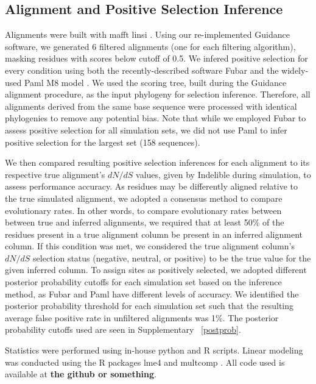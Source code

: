 \documentclass[10pt]{article}
\begin{document}
\subsection*{Alignment and Positive Selection Inference}
Alignments were built with mafft linsi \citep{Katoh2002,Katoh2005}. Using our re-implemented Guidance software, we generated 6 filtered alignments (one for each filtering algorithm), masking residues with scores below cutoff of 0.5. We infered positive selection for every condition using both the recently-described software Fubar \citep{Murrell2013} and the widely-used Paml M8 model \citep{Yang2007}. We used the scoring tree, built during the Guidance alignment procedure, as the input phylogeny for selection inference. Therefore, all alignments derived from the same base sequence were processed with identical phylogenies to remove any potential bias. Note that while we employed Fubar to assess positive selection for all simulation sets, we did not use Paml to infer positive selection for the largest set (158 sequences).

We then compared resulting positive selection inferences for each alignment to its respective true alignment's $dN/dS$ values, given by Indelible during simulation, to assess performance accuracy. As residues may be differently aligned relative to the true simulated alignment, we adopted a consensus method to compare evolutionary rates. In other words, to compare evolutionary rates between between true and inferred alignments, we required that at least 50\% of the residues present in a true alignment column be present in an inferred alignment column. If this condition was met, we considered the true alignment column’s $dN/dS$  selection status (negative, neutral, or positive) to be the true value for the given inferred column. To assign sites as positively selected, we adopted different posterior probability cutoffs for each simulation set based on the inference method, as Fubar and Paml have different levels of accuracy. We identified the posterior probability threshold for each simulation set such that the resulting average false positive rate in unfiltered alignments was 1\%. The posterior probability cutoffs used are seen in Supplementary ~\ref{postprob}.

Statistics were performed using in-house python and R scripts. Linear modeling was conducted using the R packages lme4 \citep{Bates2012} and
multcomp \citep{Hothorn2008}. All code used is available at \textbf{the github or something}.


\end{document}
